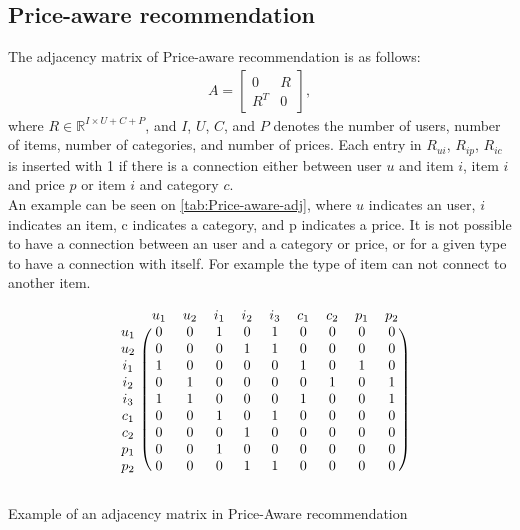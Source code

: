 \subsection{Price-aware recommendation}
The adjacency matrix of Price-aware recommendation is as follows:
\begin{gather}
    A =
    \begin{bmatrix}
        0   & R \\
        R^T & 0
    \end{bmatrix},
\end{gather}
where $R \in \mathbb{R}^{I \times U+C+P}$, and $I$, $U$, $C$, and $P$ denotes the number of users, number of items, number of categories, and number of prices.
Each entry in $R_{ui}$, $R_{ip}$, $R_{ic}$ is inserted with 1 if there is a connection either between user $u$ and item $i$, item $i$ and price $p$ or item $i$ and category $c$.\\
An example can be seen on \autoref{tab:Price-aware-adj}, where $u$ indicates an user, $i$ indicates an item, c indicates a category, and p indicates a price.
It is not possible to have a connection between an user and a category or price, or for a given type to have a connection with itself.
For example the type of item can not connect to another item.
\begin{table}
    \[
        \begin{blockarray}{cccccccccc}
            & u_1 & u_2 & i_1 & i_2 & i_3 & c_1 & c_2 & p_1 & p_2 \\
            \begin{block}{c(ccccccccc)}
                u_1 & 0 & 0 & 1 & 0 & 1 & 0 & 0 & 0 & 0   \\
                u_2 & 0 & 0 & 0 & 1 & 1 & 0 & 0 & 0 & 0  \\
                i_1 & 1 & 0 & 0 & 0 & 0 & 1 & 0 & 1 & 0  \\
                i_2 & 0 & 1 & 0 & 0 & 0 & 0 & 1 & 0 & 1  \\
                i_3 & 1 & 1 & 0 & 0 & 0 & 1 & 0 & 0 & 1  \\
                c_1 & 0 & 0 & 1 & 0 & 1 & 0 & 0 & 0 & 0  \\
                c_2 & 0 & 0 & 0 & 1 & 0 & 0 & 0 & 0 & 0  \\
                p_1 & 0 & 0 & 1 & 0 & 0 & 0 & 0 & 0 & 0  \\
                p_2 & 0 & 0 & 0 & 1 & 1 & 0 & 0 & 0 & 0  \\
            \end{block}
        \end{blockarray}
    \]
    \caption{Example of an adjacency matrix in Price-Aware recommendation}
    \label{tab:Price-aware-adj}
\end{table}
